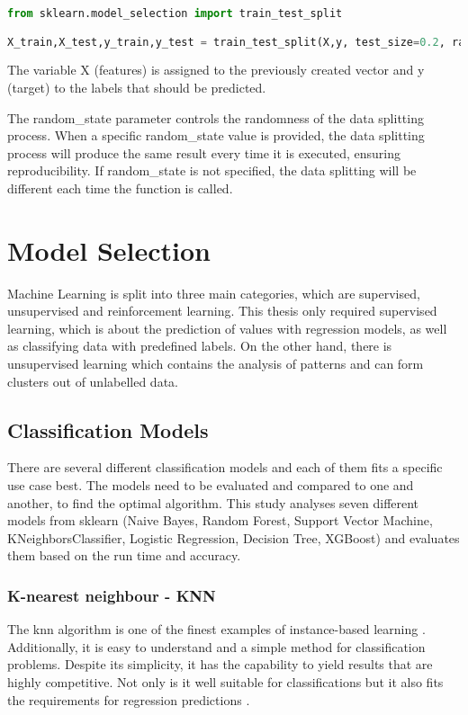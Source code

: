 \begin{lstlisting}[language=Python, caption=Train-Test-Split in Python \citep{sklearn_ttt}, label=lst:train-test-split]
from sklearn.model_selection import train_test_split

X_train,X_test,y_train,y_test = train_test_split(X,y, test_size=0.2, random_state=42)
\end{lstlisting}

The variable X (features) is assigned to the previously created vector and y (target) to the labels that should be predicted. 

The random\_state parameter controls the randomness of the data splitting process. When a specific random\_state value is provided, the data splitting process will produce the same result every time it is executed, ensuring reproducibility. If random\_state is not specified, the data splitting will be different each time the function is called.

\section{Model Selection}

Machine Learning is split into three main categories, which are supervised, unsupervised and reinforcement learning. This thesis only required supervised learning, which is about the prediction of values with regression models, as well as classifying data with predefined labels. On the other hand, there is unsupervised learning which contains the analysis of patterns and can form clusters out of unlabelled data.

\subsection{Classification Models}

There are several different classification models and each of them fits a specific use case best. 
The models need to be evaluated and compared to one and another, to find the optimal algorithm. This study analyses seven different models from sklearn (Naive Bayes, Random Forest, Support Vector Machine, KNeighborsClassifier, Logistic Regression, Decision Tree, XGBoost) and evaluates them based on the run time and accuracy. 

\subsubsection{K-nearest neighbour - KNN}
The \ac{knn} algorithm is one of the finest examples of instance-based learning \citep{sen_supervised_2020}. Additionally, it is easy to understand and a simple method for classification problems. Despite its simplicity, it has the capability to yield results that are highly competitive. Not only is it well suitable for classifications but it also fits the requirements for regression predictions \citep{sen_supervised_2020}.

